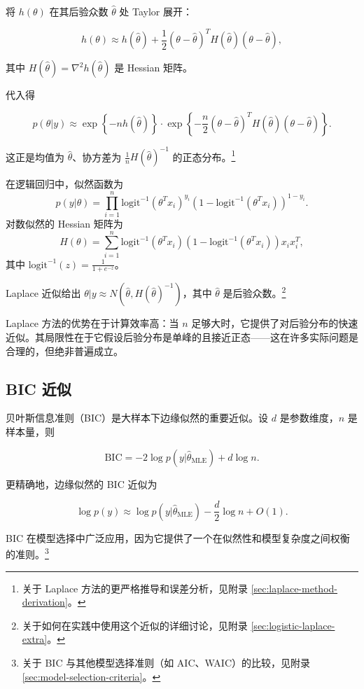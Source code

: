 将 $h(\theta)$ 在其后验众数 $\hat{\theta}$ 处 Taylor 展开：

\[
h(\theta) \approx h(\hat{\theta}) + \frac{1}{2} (\theta - \hat{\theta})^T H(\hat{\theta}) (\theta - \hat{\theta}),
\]

其中 $H(\hat{\theta}) = \nabla^2 h(\hat{\theta})$ 是 Hessian 矩阵。

代入得

\[
p(\theta | y) \approx \exp\left\{-n h(\hat{\theta})\right\} \cdot \exp\left\{-\frac{n}{2} (\theta - \hat{\theta})^T H(\hat{\theta}) (\theta - \hat{\theta})\right\}.
\]

这正是均值为 $\hat{\theta}$、协方差为 $\frac{1}{n} H(\hat{\theta})^{-1}$ 的正态分布。\footnote{关于 Laplace 方法的更严格推导和误差分析，见附录 \cref{sec:laplace-method-derivation}。}

\begin{Example}\label{ex:logistic-laplace}
  在逻辑回归中，似然函数为
  \[
  p(y | \theta) = \prod_{i=1}^n \text{logit}^{-1}(\theta^T x_i)^{y_i} (1 - \text{logit}^{-1}(\theta^T x_i))^{1-y_i}.
  \]
  对数似然的 Hessian 矩阵为
  \[
  H(\theta) = \sum_{i=1}^n \text{logit}^{-1}(\theta^T x_i) (1 - \text{logit}^{-1}(\theta^T x_i)) x_i x_i^T,
  \]
  其中 $\text{logit}^{-1}(z) = \frac{1}{1 + e^{-z}}$。

  Laplace 近似给出 $\theta | y \approx N(\hat{\theta}, H(\hat{\theta})^{-1})$，其中 $\hat{\theta}$ 是后验众数。\footnote{关于如何在实践中使用这个近似的详细讨论，见附录 \cref{sec:logistic-laplace-extra}。}
\end{Example}

Laplace 方法的优势在于计算效率高：当 $n$ 足够大时，它提供了对后验分布的快速近似。其局限性在于它假设后验分布是单峰的且接近正态——这在许多实际问题是合理的，但绝非普遍成立。

\subsection{BIC 近似}

贝叶斯信息准则（BIC）是大样本下边缘似然的重要近似。设 $d$ 是参数维度，$n$ 是样本量，则

\[
\text{BIC} = -2 \log p(y | \hat{\theta}_{\text{MLE}}) + d \log n.
\]

更精确地，边缘似然的 BIC 近似为

\[
\log p(y) \approx \log p(y | \hat{\theta}_{\text{MLE}}) - \frac{d}{2} \log n + O(1).
\]

BIC 在模型选择中广泛应用，因为它提供了一个在似然性和模型复杂度之间权衡的准则。\footnote{关于 BIC 与其他模型选择准则（如 AIC、WAIC）的比较，见附录 \cref{sec:model-selection-criteria}。}

